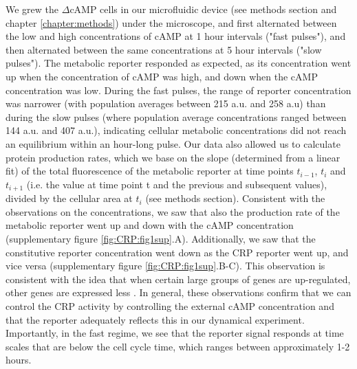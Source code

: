 We grew the $\Delta$cAMP cells in our microfluidic device (see methods section and chapter \ref{chapter:methods}) under the microscope, and 
first alternated between the low and high concentrations of cAMP at 1 hour intervals ("fast pulses"), and then alternated between the same concentrations at 5 hour intervals ("slow pulses").
%
%
The metabolic reporter responded as expected, as its concentration went up when the concentration of cAMP was high, and down when the cAMP concentration was low.
%
During the fast pulses, the range of reporter concentration was narrower (with population averages between 215 a.u. and 258 a.u) than
during the slow pulses (where population average concentrations ranged between 144 a.u. and 407 a.u.),
indicating cellular metabolic concentrations did not reach an equilibrium within an hour-long pulse. 
%
% 
Our data also allowed us to calculate protein production rates, 
which we   
base on the slope (determined from a linear fit) of the total fluorescence of the metabolic reporter at time points $t_{i-1}$, $t_i$ and $t_{i+1}$ 
(i.e. the value at time point t and the previous and subsequent values),
divided by the cellular area at $t_i$ (see methods section).
%
Consistent with the observations on the concentrations, we saw that also the production rate of the metabolic reporter 
went up and down with the cAMP concentration 
(supplementary figure \ref{fig:CRP:fig1sup}.A).
%
Additionally, we saw that the constitutive reporter concentration went down as the CRP reporter went up, and vice versa (supplementary figure \ref{fig:CRP:fig1sup}.B-C).
This observation is consistent with the idea that when certain large groups of genes are up-regulated, other genes are expressed less \cite{You2013}.
%
In general, these observations confirm that 
we can control the CRP activity by controlling the external cAMP concentration and that the reporter adequately reflects this
in our dynamical experiment. 
%
Importantly, in the fast regime, we see that the reporter signal responds at time scales that are below the cell cycle time, which ranges between approximately 1-2 hours.


